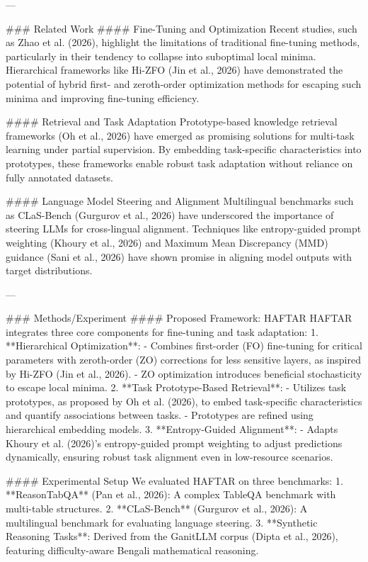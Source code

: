 ---

### Related Work
#### Fine-Tuning and Optimization
Recent studies, such as Zhao et al. (2026), highlight the limitations of traditional fine-tuning methods, particularly in their tendency to collapse into suboptimal local minima. Hierarchical frameworks like Hi-ZFO (Jin et al., 2026) have demonstrated the potential of hybrid first- and zeroth-order optimization methods for escaping such minima and improving fine-tuning efficiency.

#### Retrieval and Task Adaptation
Prototype-based knowledge retrieval frameworks (Oh et al., 2026) have emerged as promising solutions for multi-task learning under partial supervision. By embedding task-specific characteristics into prototypes, these frameworks enable robust task adaptation without reliance on fully annotated datasets.

#### Language Model Steering and Alignment
Multilingual benchmarks such as CLaS-Bench (Gurgurov et al., 2026) have underscored the importance of steering LLMs for cross-lingual alignment. Techniques like entropy-guided prompt weighting (Khoury et al., 2026) and Maximum Mean Discrepancy (MMD) guidance (Sani et al., 2026) have shown promise in aligning model outputs with target distributions.

---

### Methods/Experiment
#### Proposed Framework: HAFTAR
HAFTAR integrates three core components for fine-tuning and task adaptation:
1. **Hierarchical Optimization**:
   - Combines first-order (FO) fine-tuning for critical parameters with zeroth-order (ZO) corrections for less sensitive layers, as inspired by Hi-ZFO (Jin et al., 2026).
   - ZO optimization introduces beneficial stochasticity to escape local minima.
2. **Task Prototype-Based Retrieval**:
   - Utilizes task prototypes, as proposed by Oh et al. (2026), to embed task-specific characteristics and quantify associations between tasks.
   - Prototypes are refined using hierarchical embedding models.
3. **Entropy-Guided Alignment**:
   - Adapts Khoury et al. (2026)’s entropy-guided prompt weighting to adjust predictions dynamically, ensuring robust task alignment even in low-resource scenarios.

#### Experimental Setup
We evaluated HAFTAR on three benchmarks:
1. **ReasonTabQA** (Pan et al., 2026): A complex TableQA benchmark with multi-table structures.
2. **CLaS-Bench** (Gurgurov et al., 2026): A multilingual benchmark for evaluating language steering.
3. **Synthetic Reasoning Tasks**: Derived from the GanitLLM corpus (Dipta et al., 2026), featuring difficulty-aware Bengali mathematical reasoning.

